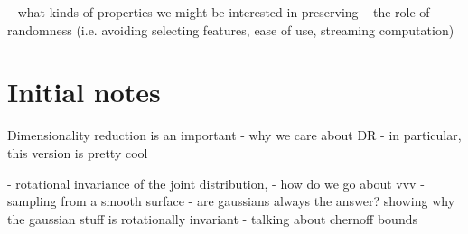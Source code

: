 \documentclass[11pt]{article}
\begin{document}
-- what kinds of properties we might be interested in preserving
-- the role of randomness (i.e. avoiding selecting features, ease of use, streaming computation)


\section{Initial notes}

Dimensionality reduction is an important 
- why we care about DR
- in particular, this version is pretty cool

- rotational invariance of the joint distribution, 
- how do we go about vvv 
- sampling from a smooth surface
- are gaussians always the answer?
showing why the gaussian stuff is rotationally invariant
- talking about chernoff bounds
{}

\end{document}
